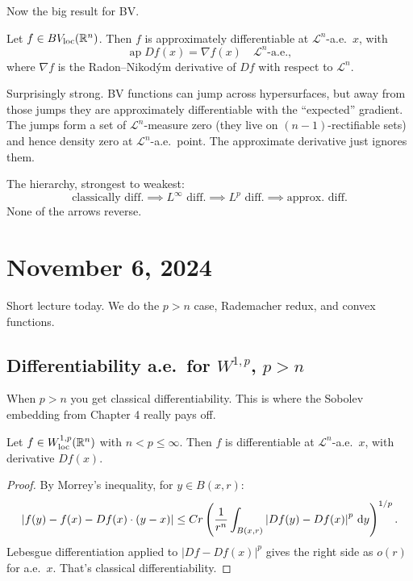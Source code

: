 Now the big result for BV.

\begin{theorem}\label{thm:bv-ap-diff}
Let $f \in BV_{\mathrm{loc}}(\mathbb{R}^n)$. Then $f$ is approximately differentiable at $\mathcal{L}^n$-a.e.\ $x$, with
\[
    \operatorname{ap} Df(x) = \nabla f(x) \quad \mathcal{L}^n\text{-a.e.},
\]
where $\nabla f$ is the Radon--Nikod\'ym derivative of $Df$ with respect to $\mathcal{L}^n$.
\end{theorem}

Surprisingly strong. BV functions can jump across hypersurfaces, but away from those jumps they are approximately differentiable with the ``expected'' gradient. The jumps form a set of $\mathcal{L}^n$-measure zero (they live on $(n-1)$-rectifiable sets) and hence density zero at $\mathcal{L}^n$-a.e.\ point. The approximate derivative just ignores them.

\begin{remark}\label{rmk:hierarchy}
The hierarchy, strongest to weakest:
\[
    \text{classically diff.} \implies L^\infty \text{ diff.} \implies L^p \text{ diff.} \implies \text{approx.\ diff.}
\]
None of the arrows reverse.
\end{remark}


\section{November 6, 2024}\label{sec:nov6}

Short lecture today. We do the $p > n$ case, Rademacher redux, and convex functions.

\subsection{Differentiability a.e.\ for $W^{1,p}$, $p > n$}\label{subsec:diff-ae}

When $p > n$ you get classical differentiability. This is where the Sobolev embedding from Chapter 4 really pays off.

\begin{theorem}\label{thm:diff-ae-sobolev}
Let $f \in W^{1,p}_{\mathrm{loc}}(\mathbb{R}^n)$ with $n < p \le \infty$. Then $f$ is differentiable at $\mathcal{L}^n$-a.e.\ $x$, with derivative $Df(x)$.
\end{theorem}

\begin{proof}
By Morrey's inequality, for $y \in B(x,r)$:
\[
    \left|f(y) - f(x) - Df(x) \cdot (y-x)\right| \le C r \left( \frac{1}{r^n} \int_{B(x,r)} \left|Df(y) - Df(x)\right|^p \,\mathrm{d} y \right)^{1/p}.
\]
Lebesgue differentiation applied to $|Df - Df(x)|^p$ gives the right side as $o(r)$ for a.e.\ $x$. That's classical differentiability.
\end{proof}

